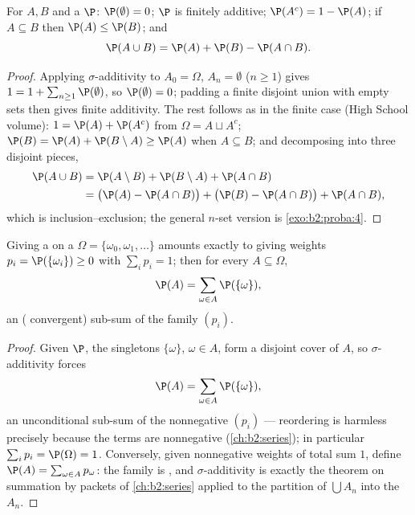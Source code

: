 \begin{proposition}\label{prop:b2:proba:rules}
For  $A, B$ and a  $\P$:
$\P(\emptyset) = 0$; $\P$ is finitely additive; $\P(A^c) = 1 -
\P(A)$; if $A \subseteq B$ then $\P(A) \leq \P(B)$; and
\[
\P(A \cup B) = \P(A) + \P(B) - \P(A \cap B) .
\]
\end{proposition}

\begin{proof}
Applying $\sigma$-additivity to $A_0 = \Omega$, $A_n = \emptyset$
($n \geq 1$) gives $1 = 1 + \sum_{n\geq1}\P(\emptyset)$, so
$\P(\emptyset) = 0$; padding a finite disjoint union with empty
sets then gives finite additivity. The rest follows as in the
finite case (High School volume): $1 = \P(A) + \P(A^c)$ from
$\Omega = A \sqcup A^c$; $\P(B) = \P(A) + \P(B \setminus A)
\geq \P(A)$ when $A \subseteq B$; and decomposing into three
disjoint pieces,
\begin{align*}
\P(A \cup B) &= \P(A \setminus B) + \P(B \setminus A) +
\P(A \cap B)\\
&= \bigl(\P(A) - \P(A\cap B)\bigr) + \bigl(\P(B) - \P(A\cap
B)\bigr) + \P(A \cap B),
\end{align*}
which is inclusion--exclusion; the general $n$-set version is
\cref{exo:b2:proba:4}.
\end{proof}

\begin{proposition}\label{prop:b2:proba:distribution}
Giving a  on a  $\Omega =
\{\omega_0, \omega_1, \dots\}$ amounts exactly to giving weights
$p_i = \P(\{\omega_i\}) \geq 0$ with $\sum_i p_i = 1$; then for
every $A \subseteq \Omega$,
\[
\P(A) = \sum_{\omega \in A} \P(\{\omega\}) ,
\]
an ( convergent) sub-sum of the family $(p_i)$.
\end{proposition}

\begin{proof}
Given $\P$, the singletons $\{\omega\}$, $\omega \in A$, form a
 disjoint cover of $A$, so $\sigma$-additivity forces
\[
\P(A) = \sum_{\omega\in A}\P(\{\omega\}),
\]
an unconditional sub-sum of the nonnegative 
$(p_i)$ --- reordering is harmless precisely because the
terms are nonnegative (\cref{ch:b2:series}); in particular
$\sum_ip_i = \P(\Omega) = 1$.
Conversely, given nonnegative weights of total sum $1$, define
$\P(A) = \sum_{\omega \in A}p_\omega$: the family is , and
$\sigma$-additivity is exactly the theorem on summation by packets
of \cref{ch:b2:series} applied to the partition of $\bigcup A_n$
into the $A_n$.
\end{proof}

